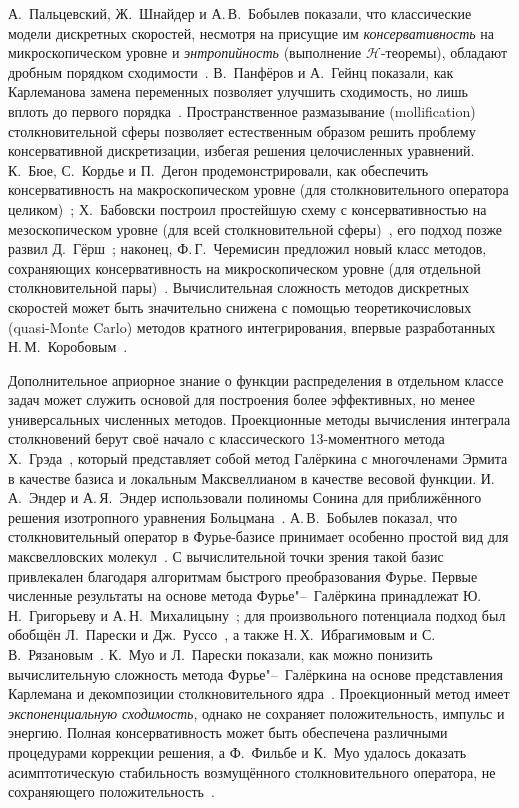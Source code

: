 А.~Пальцевский, Ж.~Шнайдер и А.\,В.~Бобылев показали, что классические модели дискретных скоростей,
несмотря на присущие им \emph{консервативность} на микроскопическом уровне и \emph{энтропийность}
(выполнение \(\mathcal{H}\)-теоремы), обладают дробным порядком сходимости~\autocite{Palczewski1997}.
В.~Панфёров и А.~Гейнц показали, как Карлеманова замена переменных
позволяет улучшить сходимость, но лишь вплоть до первого порядка~\autocite{Panferov2002}.
Пространственное размазывание (mollification) столкновительной сферы позволяет естественным образом
решить проблему консервативной дискретизации, избегая решения целочисленных уравнений.
К.~Бюе, С.~Кордье и П.~Дегон продемонстрировали, как обеспечить консервативность на макроскопическом уровне
(для столкновительного оператора целиком)~\autocite{Buet1998};
Х.~Бабовски построил простейшую схему с консервативностью на мезоскопическом уровне
(для всей столкновительной сферы)~\autocite{Babovsky1998}, его подход позже развил Д.~Гёрш~\autocite{Goersch2002};
наконец, Ф.\,Г.~Черемисин предложил новый класс методов, сохраняющих консервативность на микроскопическом уровне
(для отдельной столкновительной пары)~\autocite{Tcheremissine1997}.
Вычислительная сложность методов дискретных скоростей может быть значительно снижена
с помощью теоретикочисловых (quasi-Monte Carlo) методов кратного интегрирования,
впервые разработанных Н.\,М.~Коробовым~\autocite{Korobov1959}.

Дополнительное априорное знание о функции распределения в отдельном классе задач может служить
основой для построения более эффективных, но менее универсальных численных методов.
Проекционные методы вычисления интеграла столкновений берут своё начало с классического
13-моментного метода Х.~Грэда~\autocite{Grad1949}, который представляет собой метод Галёркина
с многочленами Эрмита в качестве базиса и локальным Максвеллианом в качестве весовой функции.
И.\,А.~Эндер и А.\,Я.~Эндер использовали полиномы Сонина для приближённого решения изотропного уравнения Больцмана~\autocite{Ender1970}.
А.\,В.~Бобылев показал, что столкновительный оператор в Фурье-базисе принимает особенно простой вид
для максвелловских молекул~\autocite{Bobylev1975}.
С вычислительной точки зрения такой базис привлекален благодаря алгоритмам быстрого преобразования Фурье.
Первые численные результаты на основе метода Фурье"--~Галёркина принадлежат
Ю.\,Н.~Григорьеву и А.\,Н.~Михалицыну~\autocite{Grigoriev1983};
для произвольного потенциала подход был обобщён Л.~Парески и Дж.~Руссо~\autocite{Pareschi2000method},
а также Н.\,Х.~Ибрагимовым и С.\,В.~Рязановым~\autocite{Ibragimov2002}.
К.~Муо и Л.~Парески показали, как можно понизить вычислительную сложность метода Фурье"--~Галёркина
на основе представления Карлемана и декомпозиции столкновительного ядра~\autocite{Pareschi2006}.
Проекционный метод имеет \emph{экспоненциальную сходимость}, однако не сохраняет положительность, импульс и энергию.
Полная консервативность может быть обеспечена различными процедурами коррекции решения,
а Ф.~Фильбе и К.~Муо удалось доказать асимптотическую стабильность возмущённого столкновительного оператора,
не сохраняющего положительность~\autocite{Filbet2011}.

